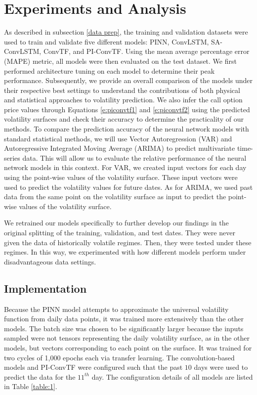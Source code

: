 \documentclass{article}
\begin{document}
\section{Experiments and Analysis} 
As described in subsection \ref{data prep}, the training and validation datasets were used to train and validate five different models: PINN, ConvLSTM, SA-ConvLSTM, ConvTF, and PI-ConvTF. Using the mean average percentage error (MAPE) metric, all models were then evaluated on the test dataset. We first performed architecture tuning on each model to determine their peak performance. Subsequently, we provide an overall comparison of the models under their respective best settings to understand the contributions of both physical and statistical approaches to volatility prediction. We also infer the call option price values through Equations \eqref{e:piconvtf1} and \eqref{e:piconvtf2} using the predicted volatility surfaces and check their accuracy to determine the practicality of our methods. {To compare the prediction accuracy of the neural network models with standard statistical methods, we will use Vector Autoregression (VAR) and Autoregressive Integrated Moving Average (ARIMA) to predict multivariate time-series data. This will allow us to evaluate the relative performance of the neural network models in this context.
For VAR, we created input vectors for each day using the point-wise values of the volatility surface. These input vectors were used to predict the volatility values for future dates.
As for ARIMA, we used past data from the same point on the volatility surface as input to predict the point-wise values of the volatility surface.
}

We retrained our models specifically to further develop our findings in the original splitting of the training, validation, and test dates. They were never given the data of historically volatile regimes. Then, they were tested under these regimes. In this way, we experimented with how different models perform under disadvantageous data settings.

\subsection{Implementation}
Because the PINN model attempts to approximate the universal volatility function from daily data points, it was trained more extensively than the other models. The batch size was chosen to be significantly larger because the inputs sampled were not tensors representing the daily volatility surface, as in the other models, but vectors corresponding to each point on the surface. It was trained for two cycles of 1,000 epochs each via transfer learning. The convolution-based models and PI-ConvTF were configured such that the past $10$ days were used to predict the data for the $11^{th}$ day. The configuration details of all models are listed in Table \ref{table:1}.
\end{document}
